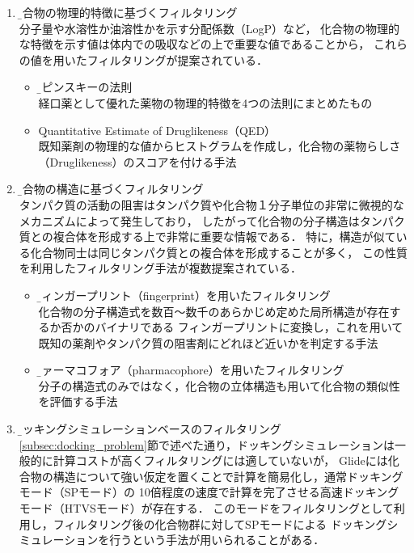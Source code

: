\begin{enumerate}
\item \b{化合物の物理的特徴に基づくフィルタリング}\\
	分子量や水溶性か油溶性かを示す分配係数（LogP）など，
	化合物の物理的な特徴を示す値は体内での吸収などの上で重要な値であることから，
	これらの値を用いたフィルタリングが提案されている．
	\begin{itemize}
	\item \b{リピンスキーの法則\cite{Lipinski1997}}\\
		経口薬として優れた薬物の物理的特徴を4つの法則にまとめたもの
	\item \b{Quantitative Estimate of Druglikeness（QED）\cite{Bickerton2012}}\\
		既知薬剤の物理的な値からヒストグラムを作成し，化合物の薬物らしさ（Druglikeness）のスコアを付ける手法
	\end{itemize}
\item \b{化合物の構造に基づくフィルタリング}\\
	タンパク質の活動の阻害はタンパク質や化合物１分子単位の非常に微視的なメカニズムによって発生しており，
	したがって化合物の分子構造はタンパク質との複合体を形成する上で非常に重要な情報である．
	特に，構造が似ている化合物同士は同じタンパク質との複合体を形成することが多く，
	この性質を利用したフィルタリング手法が複数提案されている．
	\begin{itemize}
	\item \b{フィンガープリント（fingerprint）を用いたフィルタリング\cite{Nilakantan1993}}\\
		化合物の分子構造式を数百～数千のあらかじめ定めた局所構造が存在するか否かのバイナリである
		フィンガープリントに変換し，これを用いて既知の薬剤やタンパク質の阻害剤にどれほど近いかを判定する手法
	\item \b{ファーマコフォア（pharmacophore）を用いたフィルタリング\cite{Parenti2003}}\\
		分子の構造式のみではなく，化合物の立体構造も用いて化合物の類似性を評価する手法
	\end{itemize}
\item \b{ドッキングシミュレーションベースのフィルタリング}\\
	\ref{subsec:docking_problem}節で述べた通り，ドッキングシミュレーションは一般的に計算コストが高くフィルタリングには適していないが，
	Glideには化合物の構造について強い仮定を置くことで計算を簡易化し，通常ドッキングモード（SPモード）の
	10倍程度の速度\cite{GlideHomePage}で計算を完了させる高速ドッキングモード（HTVSモード）が存在する．
	このモードをフィルタリングとして利用し，フィルタリング後の化合物群に対してSPモードによる
	ドッキングシミュレーションを行うという手法が用いられることがある\cite{Fujimoto2008}．
\end{enumerate}

